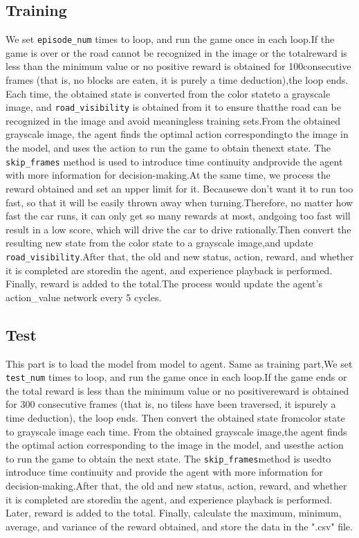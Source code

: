 \documentclass{article}
\begin{document}
\subsection{Training}
We set \texttt{episode\_num} times to loop, and run the game once in each loop.If the game is over or the road cannot be recognized in the image or the totalreward is less than the minimum value or no positive reward is obtained for 100consecutive frames (that is, no blocks are eaten, it is purely a time deduction),the loop ends. Each time, the obtained state is converted from the color stateto a grayscale image, and \texttt{road\_visibility} is obtained from it to ensure thatthe road can be recognized in the image and avoid meaningless training sets.From the obtained grayscale image, the agent finds the optimal action correspondingto the image in the model, and uses the action to run the game to obtain thenext state. The \texttt{skip\_frames} method is used to introduce time continuity andprovide the agent with more information for decision-making.At the same time, we process the reward obtained and set an upper limit for it. Becausewe don't want it to run too fast, so that it will be easily thrown away when turning.Therefore, no matter how fast the car runs, it can only get so many rewards at most, andgoing too fast will result in a low score, which will drive the car to drive rationally.Then convert the resulting new state from the color state to a grayscale image,and update \texttt{road\_visibility}.After that, the old and new status, action, reward, and whether it is completed are storedin the agent, and experience playback is performed. Finally, reward is added to the total.The process would update the agent's action\_value network every 5 cycles.
\subsection{Test}
This part is to load the model from model to agent. Same as training part,We set \texttt{test\_num} times to loop, and run the game once in each loop.If the game ends or the total reward is less than the minimum value or no positivereward is obtained for 300 consecutive frames (that is, no tiless have been traversed, it ispurely a time deduction), the loop ends. Then convert the obtained state fromcolor state to grayscale image each time. From the obtained grayscale image,the agent finds the optimal action corresponding to the image in the model, and usesthe action to run the game to obtain the next state. The \texttt{skip\_frames}method is usedto introduce time continuity and provide the agent with more information for decision-making.After that, the old and new status, action, reward, and whether it is completed are storedin the agent, and experience playback is performed. Later, reward is added to the total.
Finally, calculate the maximum, minimum, average, and variance of the reward obtained, and 
store the data in the ".csv" file.
\end{document}
